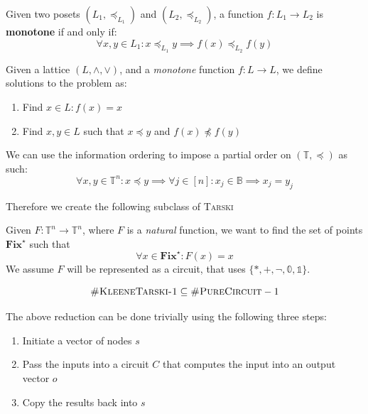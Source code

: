 \begin{definition}
    Given two posets $(L_1, \preceq_{L_1})$ and $(L_2, \preceq_{L_2})$, a function
    $f: L_1 \to L_2$ is \textbf{monotone} if and only if:
    $$
    \forall x,y \in L_1: x \preceq_{L_1} y \implies f(x) \preceq_{L_2} f(y)
    $$
\end{definition}
    



\begin{definition}
    Given a lattice $(L, \wedge, \vee)$, and a \textit{monotone} function $f : L \to L$,
    we define solutions to the problem as:
    \begin{enumerate}
        \item Find $x \in L: f(x) = x$
        \item Find $x,y \in L$ such that $x \preceq y$ and $f(x) \not\preceq f(y)$
    \end{enumerate}
\end{definition}


We can use the information ordering to impose a partial order on $(\mathbb{T}, \preceq)$ as such:
$$
\forall x,y \in \mathbb{T}^n : x \preceq y \implies \forall j \in [n]: x_j \in \mathbb{B} \implies x_j = y_j
$$

Therefore we create the following subclass of \textsc{Tarski}


\begin{definition}
    Given $F: \mathbb{T}^n \to \mathbb{T}^n$, where $F$ is a \textit{natural} function,
    we want to find the set of points $\textbf{Fix}^\star$ such that
    $$
        \forall x \in \textbf{Fix}^\star: F(x)  = x
    $$
    We assume $F$ will be represented as a circuit, that uses
    $\{*, +, \neg, \mathbb{0}, \mathbb{1}\}$.
\end{definition}


\begin{proposition}
    $$
    \textnormal{\textsc{\#KleeneTarski-1}} \subseteq \textnormal{\textsc{\#PureCircuit}} -1
    $$
\end{proposition}

The above reduction can be done trivially using the following three steps:
\begin{enumerate}
    \item Initiate a vector of nodes $s$
    \item Pass the inputs into a circuit $C$ that computes the input into an output vector $o$
    \item Copy the results back into $s$
\end{enumerate}


